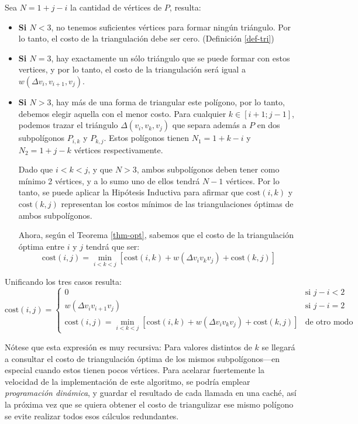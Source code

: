 \documentclass[tiny]{corsage}
\newcommand{\cost}[1]{\text{cost}(#1)}
\theoremstyle{plain}
\theoremstyle{definition}
\begin{document}
	Sea $N = 1 + j - i$ la cantidad de vértices de $P$, resulta:
	\begin{itemize}
		\item \textbf{Si $N < 3$}, no tenemos suficientes vértices para formar ningún triángulo.  Por lo tanto, el costo de la triangulación debe ser cero.  (Definición \ref{def-tri})
		\item \textbf{Si $N = 3$}, hay exactamente un sólo triángulo que se puede formar con estos vertices, y por lo tanto, el costo de la triangulación será igual a $w(\Delta{v_i,v_{i+1},v_j})$.
		\item \textbf{Si $N > 3$}, hay más de una forma de triangular este polígono, por lo tanto, debemos elegir aquella con el menor costo.  Para cualquier $k \in [i + 1; j - 1]$, podemos trazar el triángulo $\Delta(v_i,v_k,v_j)$ que separa además a $P$ en dos subpolígonos $P_{i,k}$ y $P_{k,j}$.  Estos polígonos tienen $N_1 = 1 + k - i$ y $N_2 = 1 + j - k$ vértices respectivamente.

			Dado que $i < k < j$, y que $N > 3$, ambos subpolígonos deben tener como mínimo 2 vértices, y a lo sumo uno de ellos tendrá $N - 1$ vértices.  Por lo tanto, se puede aplicar la Hipótesis Inductiva para afirmar que $\cost{i, k}$ y $\cost{k, j}$ representan los costos mínimos de las triangulaciones óptimas de ambos subpolígonos.

			Ahora, según el Teorema \ref{thm-opt}, sabemos que el costo de la triangulación óptima entre $i$ y $j$ tendrá que ser:
			\[ \cost{i, j} = \min_{i < k < j}{\left [ \cost{i, k} + w(\Delta{v_iv_kv_j}) + \cost{k, j} \right ]} \]
	\end{itemize}

	Unificando los tres casos resulta:
	\begin{equation}
		\cost{i, j} = \left \{ \begin{array}{ll}
			0 & \text{si } j - i < 2 \\
			w(\Delta{v_iv_{i + 1}v_j}) & \text{si } j - i = 2 \\
			\cost{i, j} = \displaystyle\min_{i < k < j}{\left [ \cost{i, k} + w(\Delta{v_iv_kv_j}) + \cost{k, j} \right ]} & \text{de otro modo}
		\end{array}\right .
		\label{def-cost}
	\end{equation}

	Nótese que esta expresión es muy recursiva:  Para valores distintos de $k$ se llegará a consultar el costo de triangulación óptima de los mismos subpolígonos---en especial cuando estos tienen pocos vértices.  Para acelarar fuertemente la velocidad de la implementación de este algoritmo, se podría emplear \emph{programación dinámica}, y guardar el resultado de cada llamada en una caché, así la próxima vez que se quiera obtener el costo de triangulizar ese mismo polígono se evite realizar todos esos cálculos redundantes.
\end{document}
